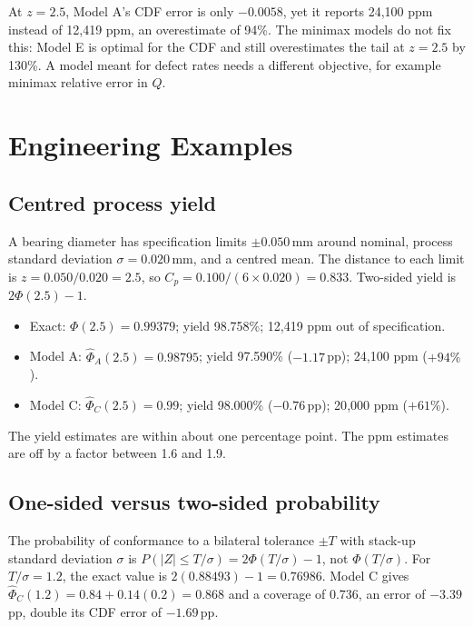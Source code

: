 \documentclass[10pt,a4paper]{article}
\newcommand{\Phihat}{\hat{\Phi}}
\newcommand{\pp}{\,\textup{pp}}
\begin{document}
At $z = 2.5$, Model A's CDF error is only $-0.0058$, yet it reports 24{,}100 ppm instead of 12{,}419 ppm, an overestimate of 94\%. The minimax models do not fix this: Model E is optimal for the CDF and still overestimates the tail at $z=2.5$ by 130\%. A model meant for defect rates needs a different objective, for example minimax relative error in $Q$.

\section{Engineering Examples}

\subsection{Centred process yield}

A bearing diameter has specification limits $\pm0.050$\,mm around nominal, process standard deviation $\sigma = 0.020$\,mm, and a centred mean. The distance to each limit is $z = 0.050/0.020 = 2.5$, so $C_p = 0.100/(6\times0.020) = 0.833$. Two-sided yield is $2\Phi(2.5)-1$.

\begin{itemize}[leftmargin=1.4em,itemsep=2pt]
\item Exact: $\Phi(2.5) = 0.99379$; yield 98.758\%; 12{,}419 ppm out of specification.
\item Model A: $\Phihat_A(2.5) = 0.98795$; yield 97.590\% ($-1.17$\pp); 24{,}100 ppm ($+94\%$).
\item Model C: $\Phihat_C(2.5) = 0.99$; yield 98.000\% ($-0.76$\pp); 20{,}000 ppm ($+61\%$).
\end{itemize}

The yield estimates are within about one percentage point. The ppm estimates are off by a factor between 1.6 and 1.9.

\subsection{One-sided versus two-sided probability}

The probability of conformance to a bilateral tolerance $\pm T$ with stack-up standard deviation $\sigma$ is $P(|Z|\le T/\sigma) = 2\Phi(T/\sigma)-1$, not $\Phi(T/\sigma)$. For $T/\sigma = 1.2$, the exact value is $2(0.88493)-1 = 0.76986$. Model C gives $\Phihat_C(1.2) = 0.84 + 0.14(0.2) = 0.868$ and a coverage of 0.736, an error of $-3.39$\pp, double its CDF error of $-1.69$\pp.
\end{document}
